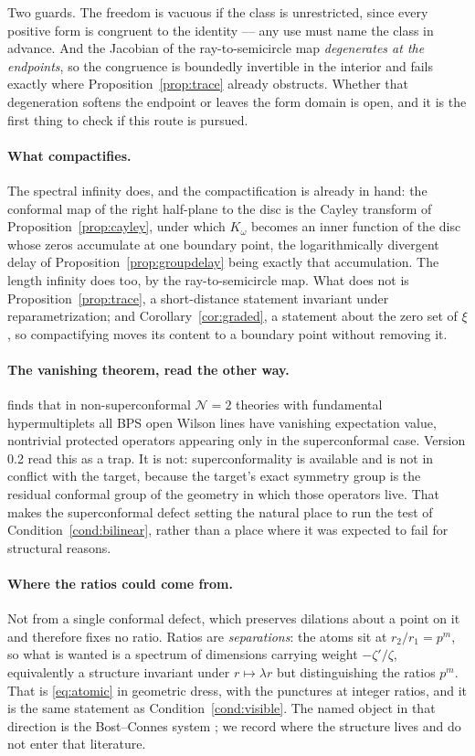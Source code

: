 Two guards. The freedom is vacuous if the class is unrestricted, since every
positive form is congruent to the identity --- any use must name the class in
advance. And the Jacobian of the ray-to-semicircle map \emph{degenerates at the
endpoints}, so the congruence is boundedly invertible in the interior and fails
exactly where Proposition~\ref{prop:trace} already obstructs. Whether that
degeneration softens the endpoint or leaves the form domain is open, and it is the
first thing to check if this route is pursued.

\paragraph{What compactifies.} The spectral infinity does, and the
compactification is already in hand: the conformal map of the right half-plane to
the disc is the Cayley transform of Proposition~\ref{prop:cayley}, under which
$K_\omega$ becomes an inner function of the disc whose zeros accumulate at one
boundary point, the logarithmically divergent delay of
Proposition~\ref{prop:groupdelay} being exactly that accumulation. The length
infinity does too, by the ray-to-semicircle map. What does not is
Proposition~\ref{prop:trace}, a short-distance statement invariant under
reparametrization; and Corollary~\ref{cor:graded}, a statement about the zero set
of $\xi$, so compactifying moves its content to a boundary point without removing
it.

\paragraph{The vanishing theorem, read the other way.}
\cite{OWL} finds that in non-superconformal $\mathcal N=2$ theories with
fundamental hypermultiplets all BPS open Wilson lines have vanishing expectation
value, nontrivial protected operators appearing only in the superconformal case.
Version 0.2 read this as a trap. It is not: superconformality is available and is
not in conflict with the target, because the target's exact symmetry group is the
residual conformal group of the geometry in which those operators live. That
makes the superconformal defect setting the natural place to run the test of
Condition~\ref{cond:bilinear}, rather than a place where it was expected to fail
for structural reasons.

\paragraph{Where the ratios could come from.} Not from a single conformal defect,
which preserves dilations about a point on it and therefore fixes no ratio.
Ratios are \emph{separations}: the atoms sit at $r_2/r_1=p^m$, so what is wanted
is a spectrum of dimensions carrying weight $-\zeta'/\zeta$, equivalently a
structure invariant under $r\mapsto\lambda r$ but distinguishing the ratios
$p^m$. That is \eqref{eq:atomic} in geometric dress, with the punctures at
integer ratios, and it is the same statement as Condition~\ref{cond:visible}. The
named object in that direction is the Bost--Connes system \cite{BostConnes}; we
record where the structure lives and do not enter that literature.
